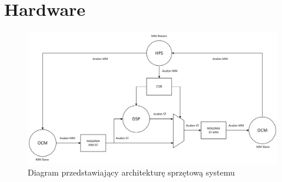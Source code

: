 \chapter{Hardware}
\label{cha:hardware}

\begin{figure}[!htb]
    \centerline{\includegraphics[scale=0.5]{hardwareSystemDiagram.png}}
    \caption{Diagram przedstawiający architekturę sprzętową systemu}
    \label{fig:architektura-hw}
\end{figure}
